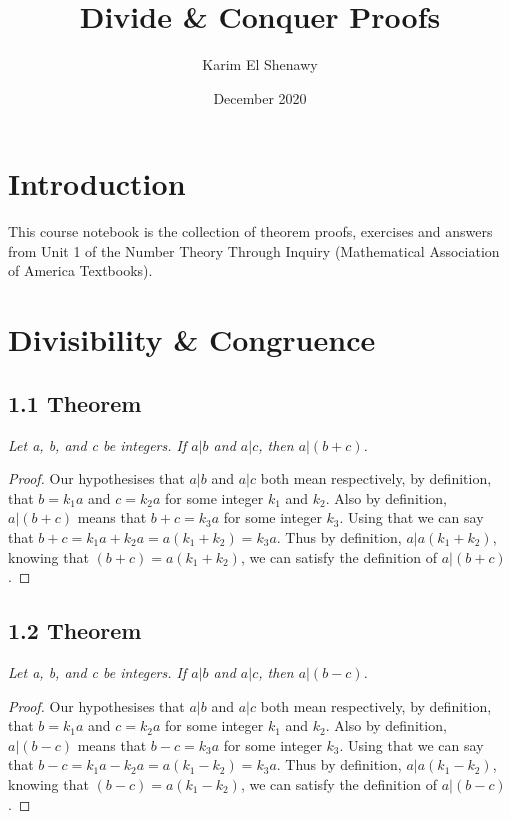 \documentclass{article}
\title{Divide \& Conquer Proofs}
\author{Karim El Shenawy}
\date{December 2020}
\begin{document}
\maketitle

\section*{Introduction}
This course notebook is the collection of theorem proofs, exercises and answers from Unit 1 of the Number Theory Through Inquiry (Mathematical Association of America Textbooks).

\section*{Divisibility \& Congruence}

\subsection*{1.1 Theorem} 
\quad \textit{Let a, b, and c be integers. If $a \vert b$ and $a \vert c$, then $a \vert (b+c)$.}

\begin{proof}
Our hypothesises that $a \vert b$ and $a \vert c$ both mean respectively, by definition, that $b = k_1a$ and $c = k_2a$ for some integer $k_1$ and $k_2$. Also by definition, $a \vert (b+c)$ means that $b + c = k_3a$ for some integer $k_3$. Using that we can say that $b + c = k_1a + k_2a = a(k_1+k_2) = k_3a$. Thus by definition, $a \vert a(k_1+k_2)$, knowing that $(b+c) = a(k_1+k_2)$, we can satisfy the definition of $a \vert (b+c)$.
\end{proof}


\subsection*{1.2 Theorem} 
\quad \textit{Let a, b, and c be integers. If $a \vert b$ and $a \vert c$, then $a \vert (b-c)$.}

\begin{proof}
Our hypothesises that $a \vert b$ and $a \vert c$ both mean respectively, by definition, that $b = k_1a$ and $c = k_2a$ for some integer $k_1$ and $k_2$. Also by definition, $a \vert (b-c)$ means that $b - c = k_3a$ for some integer $k_3$. Using that we can say that $b - c = k_1a - k_2a = a(k_1 - k_2) = k_3a$. Thus by definition, $a \vert a(k_1 - k_2)$, knowing that $(b - c) = a(k_1 - k_2)$, we can satisfy the definition of $a \vert (b - c)$.
\end{proof}
\end{document}
